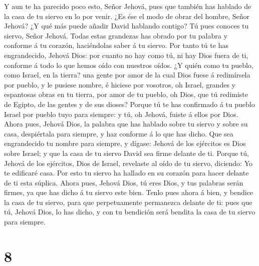  Y aun te ha parecido poco esto, Señor Jehová, pues que
también has hablado de la casa de tu siervo en lo por venir. ¿Es ése el
modo de obrar del hombre, Señor Jehová?  ¿Y qué más puede
añadir David hablando contigo? Tú pues conoces tu siervo, Señor Jehová.
 Todas estas grandezas has obrado por tu palabra y
conforme á tu corazón, haciéndolas saber á tu siervo. 
Por tanto tú te has engrandecido, Jehová Dios: por cuanto no hay como
tú, ni hay Dios fuera de ti, conforme á todo lo que hemos oído con
nuestros oídos.  ¿Y quién como tu pueblo, como Israel, en
la tierra? una gente por amor de la cual Dios fuese á redimírsela por
pueblo, y le pusiese nombre, é hiciese por vosotros, oh Israel, grandes
y espantosas obras en tu tierra, por amor de tu pueblo, oh Dios, que tú
redimiste de Egipto, de las gentes y de sus dioses? 
Porque tú te has confirmado á tu pueblo Israel por pueblo tuyo para
siempre: y tú, oh Jehová, fuiste á ellos por Dios.  Ahora
pues, Jehová Dios, la palabra que has hablado sobre tu siervo y sobre su
casa, despiértala para siempre, y haz conforme á lo que has dicho.
 Que sea engrandecido tu nombre para siempre, y dígase:
Jehová de los ejércitos es Dios sobre Israel; y que la casa de tu siervo
David sea firme delante de ti.  Porque tú, Jehová de los
ejércitos, Dios de Israel, revelaste al oído de tu siervo, diciendo: Yo
te edificaré casa. Por esto tu siervo ha hallado en su corazón para
hacer delante de ti esta súplica.  Ahora pues, Jehová
Dios, tú eres Dios, y tus palabras serán firmes, ya que has dicho á tu
siervo este bien.  Tenlo pues ahora á bien, y bendice la
casa de tu siervo, para que perpetuamente permanezca delante de ti: pues
que tú, Jehová Dios, lo has dicho, y con tu bendición será bendita la
casa de tu siervo para siempre.

\hypertarget{section-7}{%
\section{8}\label{section-7}}

